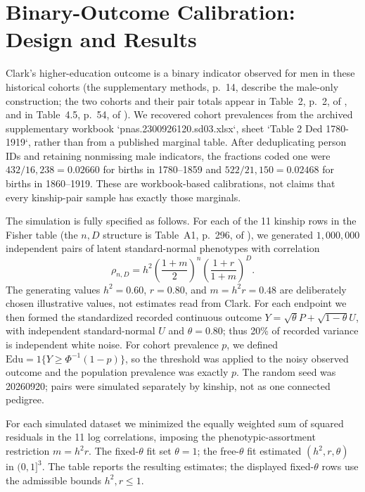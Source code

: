 \section{Binary-Outcome Calibration: Design and Results}\label{app:binary-calibration}
Clark's higher-education outcome is a binary indicator observed for men in
these historical cohorts (the supplementary methods, p.~14, describe the
male-only construction; the two cohorts and their pair totals appear in
Table~2, p.~2, of \citet{Clark2023}, and in Table~4.5, p.~54, of
\citet{Clark2026}). We recovered cohort prevalences from the archived
supplementary workbook `pnas.2300926120.sd03.xlsx`, sheet `Table 2 Ded
1780-1919`, rather than from a published marginal table. After deduplicating
person IDs and retaining nonmissing male indicators, the fractions coded one
were $432/16{,}238=0.02660$ for births in 1780--1859 and
$522/21{,}150=0.02468$ for births in 1860--1919. These are workbook-based
calibrations, not claims that every kinship-pair sample has exactly those
marginals.

The simulation is fully specified as follows. For each of the 11 kinship rows
in the Fisher table (the $n,D$ structure is Table~A1, p.~296, of
\citet{Clark2026}), we generated $1{,}000{,}000$ independent pairs of latent
standard-normal phenotypes with correlation
\[
 \rho_{n,D}=h^2\left(\frac{1+m}{2}\right)^n
 \left(\frac{1+r}{1+m}\right)^D.
\]
The generating values $h^2=0.60$, $r=0.80$, and $m=h^2r=0.48$ are deliberately
chosen illustrative values, not estimates read from Clark. For each endpoint
we then formed the standardized recorded continuous outcome
$Y=\sqrt{\theta}P+\sqrt{1-\theta}U$, with independent standard-normal $U$ and
$\theta=0.80$; thus 20\% of recorded variance is independent white noise.
For cohort prevalence $p$, we defined
$\mathrm{Edu}=1\{Y\geq\Phi^{-1}(1-p)\}$, so the threshold was applied to the
noisy observed outcome and the population prevalence was exactly $p$. The
random seed was 20260920; pairs were simulated separately by kinship, not as
one connected pedigree.

For each simulated dataset we minimized the equally weighted sum of squared
residuals in the 11 log correlations, imposing the phenotypic-assortment
restriction $m=h^2r$. The fixed-$\theta$ fit set $\theta=1$; the free-$\theta$
fit estimated $(h^2,r,\theta)$ in $(0,1]^3$. The table reports the resulting
estimates; the displayed fixed-$\theta$ rows use the admissible bounds
$h^2,r\leq1$.


